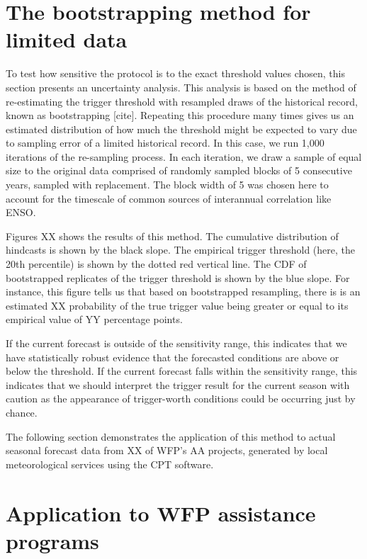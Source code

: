 \documentclass{ametsocV5}
\begin{document}
\section{The bootstrapping method for limited data}


To test how sensitive the protocol is to the exact threshold values chosen, this section presents an uncertainty analysis. This analysis is based on the method of re-estimating the trigger threshold with resampled draws of the historical record, known as bootstrapping [cite]. Repeating this procedure many times gives us an estimated distribution of how much the threshold might be expected to vary due to sampling error of a limited historical record. In this case, we run 1,000 iterations of the re-sampling process. In each iteration, we draw a sample of equal size to the original data comprised of randomly sampled blocks of 5 consecutive years, sampled with replacement. The block width of 5 was chosen here to account for the timescale of common sources of interannual correlation like ENSO. 

Figures XX shows the results of this method. The cumulative distribution of hindcasts is shown by the black slope. The empirical trigger threshold (here, the 20th percentile) is shown by the dotted red vertical line. The CDF of bootstrapped replicates of the trigger threshold is shown by the blue slope. For instance, this figure tells us that based on bootstrapped resampling, there is is an estimated XX probability of the true trigger value being greater or equal to its empirical value of YY percentage points. 

If the current forecast is outside of the sensitivity range, this indicates that we have statistically robust evidence that the forecasted conditions are above or below the threshold. If the current forecast falls within the sensitivity range, this indicates that we should interpret the trigger result for the current season with caution as the appearance of trigger-worth conditions could be occurring just by chance.

The following section demonstrates the application of this method to actual seasonal forecast data from XX of WFP's AA projects, generated by local meteorological services using the CPT software. 

\section{Application to WFP assistance programs}
\end{document}
